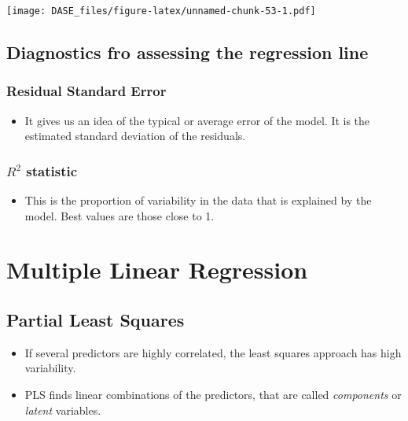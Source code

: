\documentclass[]{book}
\providecommand{\tightlist}{%
  \setlength{\itemsep}{0pt}\setlength{\parskip}{0pt}}
\begin{document}
\texttt{[image: DASE\_files/figure-latex/unnamed-chunk-53-1.pdf]}

\subsection{Diagnostics fro assessing the regression
line}\label{diagnostics-fro-assessing-the-regression-line}

\subsubsection{Residual Standard Error}\label{residual-standard-error}

\begin{itemize}
\tightlist
\item
  It gives us an idea of the typical or average error of the model. It
  is the estimated standard deviation of the residuals.
\end{itemize}

\subsubsection{\texorpdfstring{\(R^2\)
statistic}{R\^{}2 statistic}}\label{r2-statistic}

\begin{itemize}
\tightlist
\item
  This is the proportion of variability in the data that is explained by
  the model. Best values are those close to 1.
\end{itemize}

\section{Multiple Linear Regression}\label{multiple-linear-regression}

\subsection{Partial Least Squares}\label{partial-least-squares}

\begin{itemize}
\tightlist
\item
  If several predictors are highly correlated, the least squares
  approach has high variability.
\item
  PLS finds linear combinations of the predictors, that are called
  \emph{components} or \emph{latent} variables.
\end{itemize}
\end{document}
